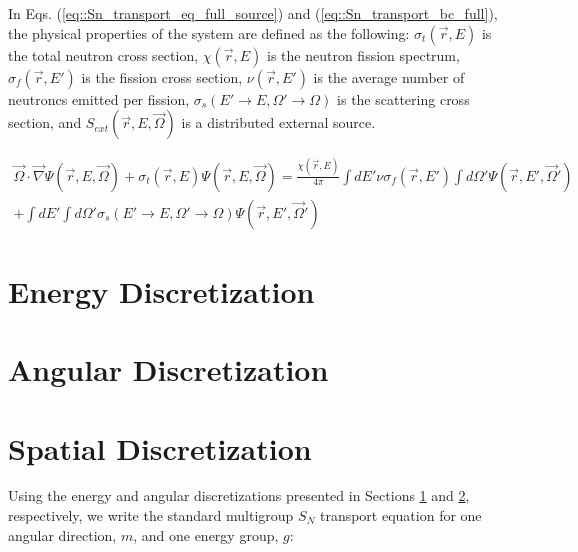 \noindent In Eqs. (\ref{eq::Sn_transport_eq_full_source}) and (\ref{eq::Sn_transport_bc_full}), the physical properties of the system are defined as the following: $\sigma_t (\vec{r}, E)$ is the total neutron cross section, $\chi (\vec{r}, E)$ is the neutron fission spectrum, $\sigma_f (\vec{r}, E')$ is the fission cross section, $\nu (\vec{r}, E')$ is the average number of neutroncs emitted per fission, $\sigma_s (E' \rightarrow E, \Omega' \rightarrow \Omega)$ is the scattering cross section, and $S_{ext} (\vec{r}, E, \vec{\Omega})$ is a distributed external source.


\begin{equation}
\label{eq::Sn_transport_eq_full_keff}
\begin{aligned}
	\vec{\Omega} \cdot \vec{\nabla} \Psi (\vec{r}, E, \vec{\Omega})+ \sigma_t (\vec{r}, E) \Psi (\vec{r}, E, \vec{\Omega}) = \frac{\chi (\vec{r}, E)}{4 \pi} \int dE' \nu \sigma_f (\vec{r}, E') \int d\Omega' \Psi (\vec{r}, E', \vec{\Omega}') \\ 
	+ \int dE' \int d\Omega' \sigma_s (E' \rightarrow E, \Omega' \rightarrow \Omega) \Psi (\vec{r}, E', \vec{\Omega}') 
\end{aligned}
\end{equation}

\section{Energy Discretization}
\label{sec::Sn_MG}

\section{Angular Discretization}
\label{sec::Sn_Angle}

\section{Spatial Discretization}
\label{sec::Sn_Spatial}

Using the energy and angular discretizations presented in Sections \ref{sec::Sn_MG} and \ref{sec::Sn_Angle}, respectively, we write the standard multigroup $S_N$ transport equation for one angular direction, $m$, and one energy group, $g$:

